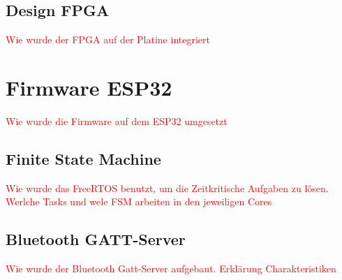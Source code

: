 \subsection{Design FPGA}
\textcolor{red}{Wie wurde der FPGA auf der Platine integriert}




\section{Firmware ESP32}
\textcolor{red}{Wie wurde die Firmware auf dem ESP32 umgesetzt}

\subsection{Finite State Machine}
\textcolor{red}{Wie wurde das FreeRTOS benutzt, um die Zeitkritische Aufgaben zu lösen. Werlche Tasks und wele FSM arbeiten in den jeweiligen Cores}


\subsection{Bluetooth GATT-Server}
\textcolor{red}{Wie wurde der Bluetooth Gatt-Server aufgebaut. Erklärung Charakteristiken}




